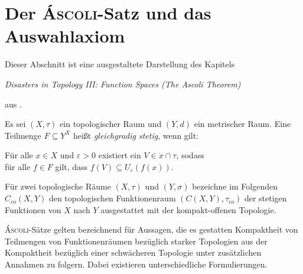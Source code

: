 \chapter{Der \textsc{Áscoli}-Satz und das Auswahlaxiom}

Dieser Abschnitt ist eine ausgestaltete Darstellung des Kapitels  
\begin{addmargin}[2em]{2em}%
  \textit{Disasters in Topology III: Function Spaces (The Ascoli Theorem)}
\end{addmargin}
aus \cite{herrlich2006axiom}.


\begin{defn}
  Es sei $(X,\tau)$ ein topologischer Raum und $(Y,d)$ ein metrischer Raum. Eine Teilmenge $F \subseteq Y^X$ heißt \textit{gleichgradig stetig}, wenn gilt:
  \begin{addmargin}[2em]{2em}%
    Für alle $x \in X$ und $\varepsilon > 0$ existiert ein $V \in \dot{x} \cap \tau$, sodass \\
    für alle $f \in F$ gilt, dass $f(V) \subseteq U_\varepsilon(f(x))$.
  \end{addmargin}
\end{defn}

Für zwei topologische Räume $(X,\tau)$ und $(Y,\sigma)$ bezeichne im Folgenden $C_{co}(X,Y)$ den topologischen Funktionenraum $(C(X,Y),\tau_{co})$ der stetigen Funktionen von $X$ nach $Y$ ausgestattet mit der kompakt-offenen Topologie.

\textsc{Áscoli}-Sätze gelten bezeichnend für Aussagen, die es gestatten Kompaktheit von Teilmengen von Funktionenräumen bezüglich starker Topologien aus der Kompaktheit bezüglich einer schwächeren Topologie unter zusätzlichen Annahmen zu folgern. Dabei existieren unterschiedliche Formulierungen.

